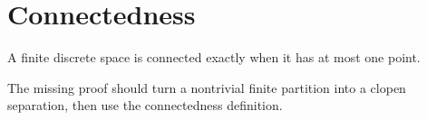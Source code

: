 \chapter{Connectedness}

\begin{theorem}
\label{thm:discrete-connected}
\notready
A finite discrete space is connected exactly when it has at most one point.
\end{theorem}

\begin{remark}
\label{rem:clopen-bridge}
The missing proof should turn a nontrivial finite partition into a clopen
separation, then use the connectedness definition.
\end{remark}
